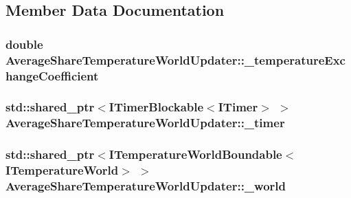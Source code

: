 \subsection{Member Data Documentation}
\hypertarget{class_average_share_temperature_world_updater_a37ebe90d538e148a8da4efa0845d334c}{
\subsubsection[{\-\_\-temperature\-Exchange\-Coefficient}]{\setlength{\rightskip}{0pt plus 5cm}double Average\-Share\-Temperature\-World\-Updater\-::\-\_\-temperature\-Exchange\-Coefficient\hspace{0.3cm}{\ttfamily [protected]}}}\label{class_average_share_temperature_world_updater_a37ebe90d538e148a8da4efa0845d334c}
\hypertarget{class_average_share_temperature_world_updater_acc17234a8b1f33e1be9c7806e4973be3}{
\subsubsection[{\-\_\-timer}]{\setlength{\rightskip}{0pt plus 5cm}std\-::shared\-\_\-ptr$<${\bf I\-Timer\-Blockable}$<${\bf I\-Timer}$>$ $>$ Average\-Share\-Temperature\-World\-Updater\-::\-\_\-timer\hspace{0.3cm}{\ttfamily [protected]}}}\label{class_average_share_temperature_world_updater_acc17234a8b1f33e1be9c7806e4973be3}
\hypertarget{class_average_share_temperature_world_updater_a7327a9c0043f7fd278edcc1e7b7ecf78}{
\subsubsection[{\-\_\-world}]{\setlength{\rightskip}{0pt plus 5cm}std\-::shared\-\_\-ptr$<${\bf I\-Temperature\-World\-Boundable}$<${\bf I\-Temperature\-World}$>$ $>$ Average\-Share\-Temperature\-World\-Updater\-::\-\_\-world\hspace{0.3cm}{\ttfamily [protected]}}}\label{class_average_share_temperature_world_updater_a7327a9c0043f7fd278edcc1e7b7ecf78}


